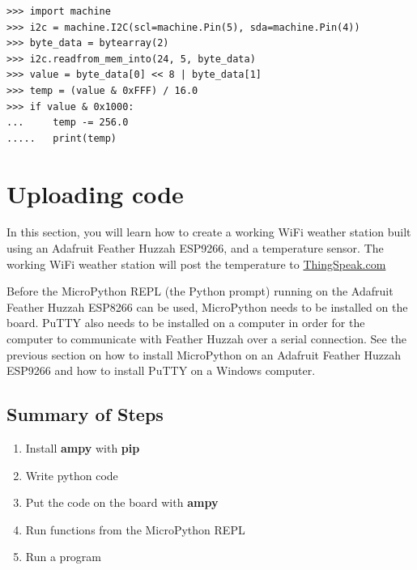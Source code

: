 \documentclass{book}
\providecommand{\tightlist}{%
      \setlength{\itemsep}{0pt}\setlength{\parskip}{0pt}}
\begin{document}
\begin{lstlisting}
>>> import machine
>>> i2c = machine.I2C(scl=machine.Pin(5), sda=machine.Pin(4))
>>> byte_data = bytearray(2)
>>> i2c.readfrom_mem_into(24, 5, byte_data)
>>> value = byte_data[0] << 8 | byte_data[1]
>>> temp = (value & 0xFFF) / 16.0
>>> if value & 0x1000:
...     temp -= 256.0
.....   print(temp)
\end{lstlisting}
    




    
        \section{Uploading code}\label{uploading-code}
    




    
        In this section, you will learn how to create a working WiFi weather
station built using an Adafruit Feather Huzzah ESP9266, and a
temperature sensor. The working WiFi weather station will post the
temperature to \href{https://thingspeak.com/}{ThingSpeak.com}

Before the MicroPython REPL (the Python prompt) running on the Adafruit
Feather Huzzah ESP8266 can be used, MicroPython needs to be installed on
the board. PuTTY also needs to be installed on a computer in order for
the computer to communicate with Feather Huzzah over a serial
connection. See the previous section on how to install MicroPython on an
Adafruit Feather Huzzah ESP9266 and how to install PuTTY on a Windows
computer.
    




    
        \subsection{Summary of Steps}\label{summary-of-steps}
    




    
        \begin{enumerate}
\def\labelenumi{\arabic{enumi}.}
\tightlist
\item
  Install \textbf{ampy} with \textbf{pip}
\item
  Write python code
\item
  Put the code on the board with \textbf{ampy}
\item
  Run functions from the MicroPython REPL
\item
  Run a program
\end{enumerate}
    
\end{document}
